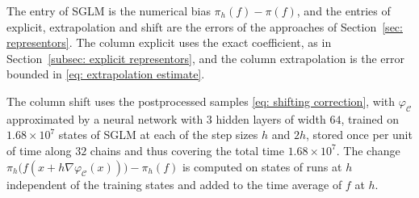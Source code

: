 The entry of SGLM is the numerical bias $\pi_h(f) - \pi(f)$, and the entries of explicit, extrapolation and shift are the errors of the approaches of Section~\ref{sec: representors}. The column explicit uses the exact coefficient, as in Section~\ref{subsec: explicit representors}, and the column extrapolation is the error bounded in \eqref{eq: extrapolation estimate}.

The column shift uses the postprocessed samples \eqref{eq: shifting correction}, with $\varphi_{\mathcal C}$ approximated by a neural network with $3$ hidden layers of width $64$, trained on $1.68 \times 10^7$ states of SGLM at each of the step sizes $h$ and $2h$, stored once per unit of time along $32$ chains and thus covering the total time $1.68 \times 10^7$. The change $\pi_h\bigl( f(x + h \nabla \varphi_{\mathcal C}(x)) \bigr) - \pi_h(f)$ is computed on states of runs at $h$ independent of the training states and added to the time average of $f$ at $h$.


